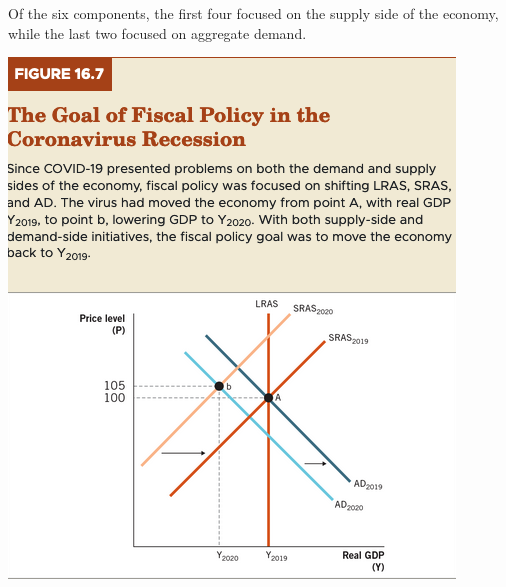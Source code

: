 \documentclass[11pt]{article} %
\begin{document}
Of the six components, the first four focused on the supply side of the economy, while the last two focused on aggregate demand.

\begin{center}
\includegraphics[scale=0.5]{images/Figure 16.7.png}
\end{center}
\end{document}
